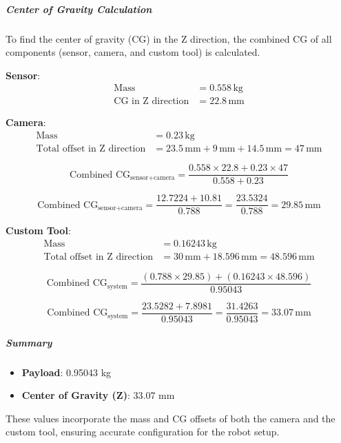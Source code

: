 \subparagraph{Center of Gravity Calculation}

To find the center of gravity (CG) in the Z direction, the combined CG of all components (sensor, camera, and custom tool) is calculated.

\textbf{Sensor}:
\begin{align*}
\text{Mass} &= 0.558 \, \text{kg} \\
\text{CG in Z direction} &= 22.8 \, \text{mm}
\end{align*}

\textbf{Camera}:
\begin{align*}
\text{Mass} &= 0.23 \, \text{kg} \\
\text{Total offset in Z direction} &= 23.5 \, \text{mm} + 9 \, \text{mm} + 14.5 \, \text{mm} = 47 \, \text{mm}
\end{align*}

\begin{equation}
\text{Combined CG}_{\text{sensor+camera}} = \frac{0.558 \times 22.8 + 0.23 \times 47}{0.558 + 0.23}
\end{equation}

\begin{equation}
\text{Combined CG}_{\text{sensor+camera}} = \frac{12.7224 + 10.81}{0.788} = \frac{23.5324}{0.788} = 29.85 \, \text{mm}
\end{equation}

\textbf{Custom Tool}:
\begin{align*}
\text{Mass} &= 0.16243 \, \text{kg} \\
\text{Total offset in Z direction} &= 30 \, \text{mm} + 18.596 \, \text{mm} = 48.596 \, \text{mm}
\end{align*}

\begin{equation}
\text{Combined CG}_{\text{system}} = \frac{(0.788 \times 29.85) + (0.16243 \times 48.596)}{0.95043}
\end{equation}

\begin{equation}
\text{Combined CG}_{\text{system}} = \frac{23.5282 + 7.8981}{0.95043} = \frac{31.4263}{0.95043} = 33.07 \, \text{mm}
\end{equation}

\subparagraph{Summary}
\begin{itemize}
    \item \textbf{Payload}: 0.95043 kg
    \item \textbf{Center of Gravity (Z)}: 33.07 mm
\end{itemize}

These values incorporate the mass and CG offsets of both the camera and the custom tool, ensuring accurate configuration for the robot setup.